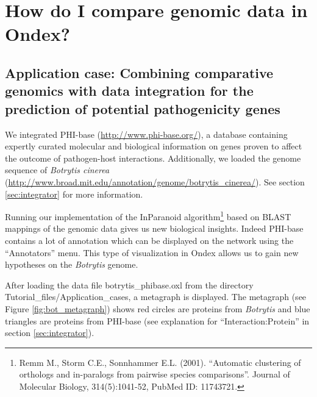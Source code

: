 
\chapter{How do I compare genomic data in Ondex?}
\label{cha:comp}


\section*{Application case: Combining comparative genomics with data integration for the prediction of potential pathogenicity genes}
\label{sec:phi_bot_app}
We integrated PHI-base (\url{http://www.phi-base.org/}), a database containing expertly curated molecular and biological information on genes 
proven to affect the outcome of pathogen-host interactions. 
Additionally, we loaded the genome sequence of \textit{Botrytis cinerea} (\url{http://www.broad.mit.edu/annotation/genome/botrytis_cinerea/}).
See section \ref{sec:integrator} for more information.

Running our implementation of the InParanoid algorithm\footnote{Remm M., Storm C.E., Sonnhammer E.L. (2001). 
``Automatic clustering of orthologs and in-paralogs from pairwise species comparisons''. Journal of Molecular Biology, 314(5):1041-52, PubMed ID: 11743721.}
based on BLAST mappings of the genomic data gives us new biological insights. 
Indeed PHI-base contains a lot of annotation which can be displayed on the network using the ``Annotators'' menu. 
This type of visualization in Ondex allows us to gain new hypotheses on the \textit{Botrytis} genome.

After loading the data file botrytis\_phibase.oxl from the directory Tutorial\_files/Application\_cases, a metagraph is displayed. 
The metagraph (see Figure \ref{fig:bot_metagraph}) shows red circles are proteins from \textit{Botrytis} and blue triangles are proteins from PHI-base 
(see explanation for ``Interaction:Protein'' in section \ref{sec:integrator}).

